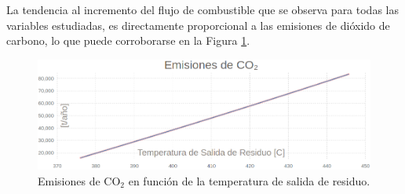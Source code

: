 \par La tendencia al incremento del flujo de combustible que se observa para todas las variables estudiadas, es directamente proporcional a las emisiones de dióxido de carbono, lo que puede corroborarse en la Figura \ref{fig:graph-t_out-emi}.
\begin{figure}[H] \begin{center}
\includegraphics[scale=0.46]{images/graph-t_out-emi}
\caption[Emisiones de CO$_2$ en función de Temperatura de salida de residuo]{Emisiones de CO$_2$ en función de la temperatura de salida de residuo.}
\label{fig:graph-t_out-emi} \end{center} \end{figure}

